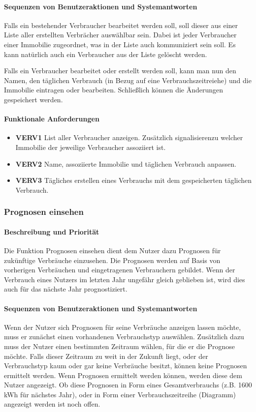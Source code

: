 \paragraph{Sequenzen von Benutzeraktionen und Systemantworten} Falls ein bestehender Verbraucher bearbeitet werden soll, soll dieser aus einer Liste aller erstellten Verbrächer auswählbar sein. Dabei ist jeder Verbraucher einer Immobilie zugeordnet, was in der Liste auch kommuniziert sein soll. Es kann natürlich auch ein Verbraucher aus der Liste gelöscht werden.

Falls ein Verbraucher bearbeitet oder erstellt werden soll, kann man nun den Namen, den täglichen Verbrauch (in Bezug auf eine Verbrauchszeitreiehe) und die Immobilie eintragen oder bearbeiten. Schließlich können die Änderungen gespeichert werden. 
\paragraph{Funktionale Anforderungen}
\begin{itemize}
	\item \textbf{VERV1} List aller Verbraucher anzeigen. Zusätzlich signalisierenzu welcher Immobilie der jeweilige Verbraucher assoziiert ist.
	\item \textbf{VERV2} Name, assoziierte Immobilie und täglichen Verbrauch anpassen.
	\item \textbf{VERV3} Tägliches erstellen eines Verbrauchs mit dem gespeicherten täglichen Verbrauch. 
\end{itemize}



\subsubsection{Prognosen einsehen}
\paragraph{Beschreibung und Priorität}
Die Funktion Prognosen einsehen dient dem Nutzer dazu Prognosen für zukünftige Verbräuche einzusehen. Die Prognosen werden auf Basis von vorherigen Verbräuchen und eingetragenen Verbrauchern gebildet. Wenn der Verbrauch eines Nutzers im letzten Jahr ungefähr gleich geblieben ist, wird dies auch für das nächste Jahr prognostiziert.
\paragraph{Sequenzen von Benutzeraktionen und Systemantworten}
Wenn der Nutzer sich Prognosen für seine Verbräuche anzeigen lassen möchte, muss er zunächst einen vorhandenen Verbrauchstyp auswählen. Zusätzlich dazu muss der Nutzer einen bestimmten Zeitraum wählen, für die er die Prognose möchte. Falls dieser Zeitraum zu weit in der Zukunft liegt, oder der Verbrauchstyp kaum oder gar keine Verbräuche besitzt, können keine Prognosen ermittelt werden. Wenn Prognosen ermittelt werden können, werden diese dem Nutzer angezeigt. Ob diese Prognosen in Form eines Gesamtverbrauchs (z.B. 1600 kWh für nächstes Jahr), oder in Form einer Verbrauchszeitreihe (Diagramm) angezeigt werden ist noch offen.

